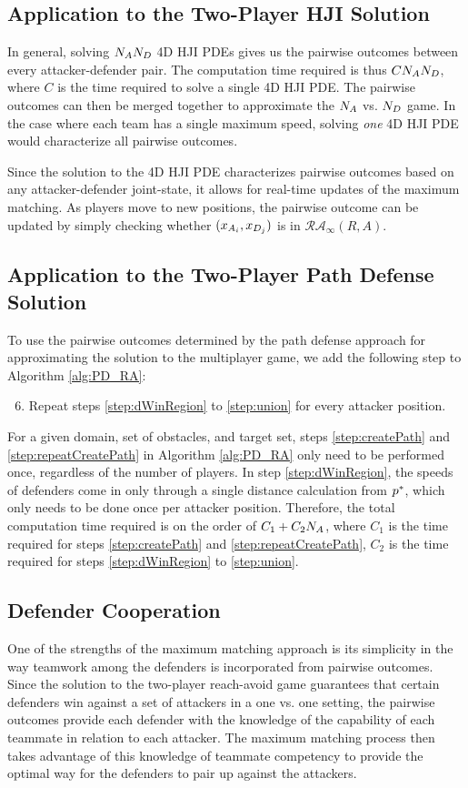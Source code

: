 \subsection{Application to the Two-Player HJI Solution}
\label{subusec:MMHJI}
In general, solving $N_AN_D$ 4D HJI PDEs gives us the pairwise outcomes between every attacker-defender pair. The computation time required is thus $C N_AN_D$, where $C$ is the time required to solve a single 4D HJI PDE. The pairwise outcomes can then be merged together to approximate the $N_A$ vs. $N_D$ game. In the case where each team has a single maximum speed, solving \textit{one} 4D HJI PDE would characterize all pairwise outcomes.

Since the solution to the 4D HJI PDE characterizes pairwise outcomes based on any attacker-defender joint-state, it allows for real-time updates of the maximum matching. As players move to new positions, the pairwise outcome can be updated by simply checking whether $(x_{A_{i}}, x_{D_{j}})$ is in $\mathcal{RA}_\infty(R,A)$.

\subsection{Application to the Two-Player Path Defense Solution}
\label{subsec:MMPD}
To use the pairwise outcomes determined by the path defense approach for approximating the solution to the multiplayer game, we add the following step to Algorithm \ref{alg:PD_RA}: 
\begin{enumerate}
\setcounter{enumi}{5}
\item Repeat steps \ref{step:dWinRegion} to \ref{step:union} for every attacker position.
\end{enumerate}

For a given domain, set of obstacles, and target set, steps \ref{step:createPath} and \ref{step:repeatCreatePath} in Algorithm \ref{alg:PD_RA} only need to be performed once, regardless of the number of players. In step \ref{step:dWinRegion}, the speeds of defenders come in only through a single distance calculation from $p^*$, which only needs to be done once per attacker position. Therefore, the total computation time required is on the order of $C_1 + C_2 N_A$, where $C_1$ is the time required for steps \ref{step:createPath} and \ref{step:repeatCreatePath}, $C_2$ is the time required for steps \ref{step:dWinRegion} to \ref{step:union}. 

\subsection{Defender Cooperation}
One of the strengths of the maximum matching approach is its simplicity in the way teamwork among the defenders is incorporated from pairwise outcomes. Since the solution to the two-player reach-avoid game guarantees that certain defenders win against a set of attackers in a one vs. one setting, the pairwise outcomes provide each defender with the knowledge of the capability of each teammate in relation to each attacker. The maximum matching process then takes advantage of this knowledge of teammate competency to provide the optimal way for the defenders to pair up against the attackers. 

